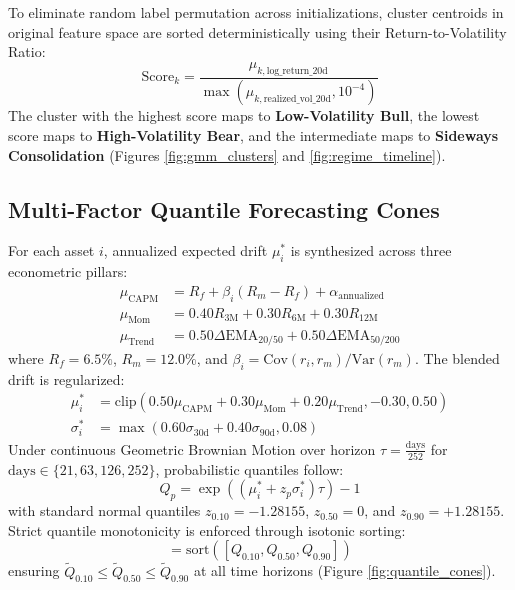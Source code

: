 \documentclass[conference]{IEEEtran}
\begin{document}
To eliminate random label permutation across initializations, cluster centroids in original feature space are sorted deterministically using their Return-to-Volatility Ratio:
\begin{equation}
\text{Score}_k = \frac{\mu_{k, \text{log\_return\_20d}}}{\max(\mu_{k, \text{realized\_vol\_20d}}, 10^{-4})}
\end{equation}
The cluster with the highest score maps to \textbf{Low-Volatility Bull}, the lowest score maps to \textbf{High-Volatility Bear}, and the intermediate maps to \textbf{Sideways Consolidation} (Figures \ref{fig:gmm_clusters} and \ref{fig:regime_timeline}).

\subsection{Multi-Factor Quantile Forecasting Cones}
For each asset $i$, annualized expected drift $\mu_i^*$ is synthesized across three econometric pillars:
\begin{align}
\mu_{\text{CAPM}} &= R_f + \beta_i (R_m - R_f) + \alpha_{\text{annualized}} \\
\mu_{\text{Mom}} &= 0.40 R_{3\text{M}} + 0.30 R_{6\text{M}} + 0.30 R_{12\text{M}} \\
\mu_{\text{Trend}} &= 0.50 \Delta\text{EMA}_{20/50} + 0.50 \Delta\text{EMA}_{50/200}
\end{align}
where $R_f = 6.5\%$, $R_m = 12.0\%$, and $\beta_i = \text{Cov}(r_i, r_m) / \text{Var}(r_m)$. The blended drift is regularized:
\begin{align}
\mu_i^* &= \text{clip}(0.50 \mu_{\text{CAPM}} + 0.30 \mu_{\text{Mom}} + 0.20 \mu_{\text{Trend}}, -0.30, 0.50) \\
\sigma_i^* &= \max(0.60 \sigma_{30\text{d}} + 0.40 \sigma_{90\text{d}}, 0.08)
\end{align}
Under continuous Geometric Brownian Motion over horizon $\tau = \frac{\text{days}}{252}$ for $\text{days} \in \{21, 63, 126, 252\}$, probabilistic quantiles follow:
\begin{equation}
Q_p = \exp\left((\mu_i^* + z_p \sigma_i^*)\tau\right) - 1
\end{equation}
with standard normal quantiles $z_{0.10} = -1.28155$, $z_{0.50} = 0$, and $z_{0.90} = +1.28155$. Strict quantile monotonicity is enforced through isotonic sorting:
\begin{equation}
[\tilde{Q}_{0.10}, \tilde{Q}_{0.50}, \tilde{Q}_{0.90}] = \text{sort}([Q_{0.10}, Q_{0.50}, Q_{0.90}])
\end{equation}
ensuring $\tilde{Q}_{0.10} \le \tilde{Q}_{0.50} \le \tilde{Q}_{0.90}$ at all time horizons (Figure \ref{fig:quantile_cones}).
\end{document}
